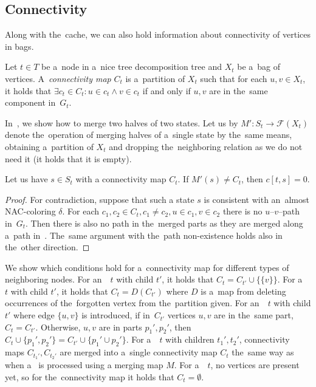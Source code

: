 \subsection{Connectivity}

Along with the~cache, we can also hold information about connectivity of
vertices in bags.
%
\begin{definition}
	Let \( t \in T \) be a~node in a~nice tree decomposition tree and
	\( X_t \) be a~bag of vertices.
	A~\emph{connectivity map} \( C_t \) is a~partition of \( X_t \) such that
	for each \( u, v \in X_t \), it holds that
	\( \exists c_t \in C_t : u \in c_t \land v \in c_t \) if and only if
	\( u, v \) are in the~same component in~\( G_t \).
\end{definition}
%

In~, we show how to merge
two halves of two states. Let us by \( M': S_t \to \mathcal{F}(X_t) \) denote
the~operation of merging halves of a~single state by the~same means,
obtaining a~partition of \( X_t \) and dropping
the~neighboring relation as we do not need it
(it holds that it is empty).
%
\begin{lemma}
	Let us have \( s \in S_t \) with a connectivity map \( C_t \).
	If \( M'(s) \ne C_t \), then \( c[t, s] = 0 \).
\end{lemma}
%
\begin{proof}
	For contradiction, suppose that such a state \( s \)
	is consistent with an~almost NAC-coloring \( \delta \).
	For each \( c_1, c_2 \in C_t, c_1 \ne c_2, u \in c_1, v \in c_2 \)
	there is no \( u \)--\( v \)--path in~\( G_t \).
	Then there is also no path in the~merged parts as
	they are merged along a~path in~.
	The~same argument with the~path non-existence
	holds also in the~other direction.
\end{proof}
%
We show which conditions hold for a~connectivity map
for different types of neighboring nodes.
%
For an~\IntroduceVertexNode{}~\( t \) with child \( t' \), it holds that
\( C_t = C_{t'} \cup \{\{ v \}\} \).
%
For a~\ForgetVertexNode{}~\( t \) with child \( t' \), it holds that
\( C_t = D(C_{t'}) \)
where \( D \) is a~map from 
deleting occurrences of the~forgotten vertex from the~partition given.
%
For an~\IntroduceEdgeNode{}~\( t \) with child \( t' \)
where edge \( \{u, v\} \) is introduced,
if in~\( C_{t'} \) vertices \( u, v \) are in the~same part, \( C_t = C_{t'} \).
Otherwise, \( u, v \) are in parts \( p_1', p_2' \), then
\( C_t \cup \{p_1', p_2'\} = C_{t'} \cup \{ p_1' \cup p_2'\} \).
%
For a~\JoinNode{}~\( t \) with children \( t_1', t_2' \),
connectivity maps \( C_{t_1'}, C_{t_2'} \) are merged into
a~single connectivity map \( C_t \)
the~same way as when a~\JoinNode{} is processed using a merging map \( M \).
%
For a~\LeafNode{}~\( t \),
no vertices are present yet, so for the~connectivity map it holds that \( C_t = \emptyset \).


